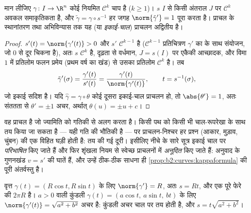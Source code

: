 \begin{theorem}[चाप-लंबाई प्राचलन]\label{thm:b2:curves:arclength}
मान लीजिए $\gamma \colon I \to \R^n$ कोई नियमित $\mathcal{C}^k$ चाप है
($k \geq 1$)।  $s$ $I$ से किसी अंतराल $J$ पर $\mathcal{C}^k$
अवकल समाकृतिकता है, और $\tilde\gamma =
\gamma \circ s^{-1}$ हर जगह $\norm{\tilde\gamma'} = 1$ पूरा
करता है। प्राचल के स्थानांतरण तथा अभिविन्यास तक यह \emph{}
(या \emph{इकाई-चाल}) प्राचलन अद्वितीय है।
\end{theorem}

\begin{proof}
$s'(t) = \norm{\gamma'(t)} > 0$ और $s'$ $\mathcal{C}^{k-1}$ है
($\mathcal{C}^{k-1}$ प्रतिचित्रण $\gamma'$ का  के साथ संयोजन,
जो $0$ से दूर चिकना है), अतः $s$ $\mathcal{C}^k$ है, दृढ़ता से
वर्धमान, $J = s(I)$ पर एकैकी आच्छादक, और विमा $1$ में प्रतिलोम
फलन प्रमेय (प्रथम वर्ष का खंड) से उसका प्रतिलोम $\mathcal{C}^k$ है। तब
\[
\tilde\gamma'(\sigma)
= \frac{\gamma'(t)}{s'(t)}
= \frac{\gamma'(t)}{\norm{\gamma'(t)}},
\qquad t = s^{-1}(\sigma),
\]
जो इकाई सदिश है। यदि $\hat\gamma = \gamma\circ\theta$ कोई दूसरा
इकाई-चाल प्राचलन हो, तो $\abs{\theta'} = 1$, अतः संततता से $\theta'
= \pm 1$ अचर, अर्थात् $\theta(u) = \pm u + c$।
\end{proof}

\begin{remark}
 वह प्राचल है जो ज्यामिति को गतिकी से अलग करता है। किसी पथ
को किसी भी चाल-रूपरेखा के साथ तय किया जा सकता है --- यही गति की
भौतिकी है --- पर प्राचलन-निश्चर हर प्रश्न (आकार, मुड़ाव, चुंबन) की
एक विहित घड़ी होती है: तय की गई दूरी। इसीलिए नीचे के सारे 
सूत्र इकाई चाल पर \emph{परिभाषित} किए जाते हैं और फिर शृंखला नियम से
स्वेच्छ प्राचलनों में \emph{अनूदित} किए जाते हैं: अनुवाद के गुणनखंड
$v = s'$ की घातें हैं, और उन्हें ठीक-ठीक साधना ही \cref{prop:b2:curves:kappaformula} की पूरी
अंतर्वस्तु है।
\end{remark}

\begin{example}[वृत्त और कुंडली]\label{ex:b2:curves:helix}
वृत्त $\gamma(t) = (R\cos t, R\sin t)$ के लिए $\norm{\gamma'} =
R$, अतः $s = Rt$, और एक पूरे फेरे की  $2\pi R$ है।
$a > 0$ वाली कुंडली $\gamma(t) = (a\cos t,\ a\sin t,\ bt)$ के लिए
$\norm{\gamma'(t)} = \sqrt{a^2 + b^2}$ अचर है: कुंडली अचर चाल पर तय होती है, और $s = t\sqrt{a^2 + b^2}$।
\end{example}

